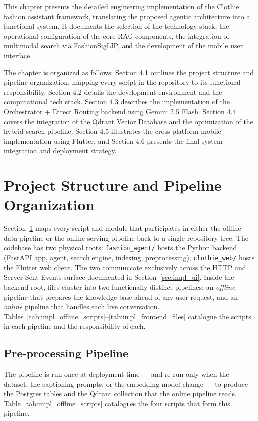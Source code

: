 This chapter presents the detailed engineering implementation of the Clothie fashion assistant framework, translating the proposed agentic architecture into a functional system. It documents the selection of the technology stack, the operational configuration of the core RAG components, the integration of multimodal search via FashionSigLIP, and the development of the mobile user interface.

The chapter is organized as follows: Section 4.1 outlines the project structure and pipeline organization, mapping every script in the repository to its functional responsibility. Section 4.2 details the development environment and the computational tech stack. Section 4.3 describes the implementation of the Orchestrator + Direct Routing backend using Gemini 2.5 Flash. Section 4.4 covers the integration of the Qdrant Vector Database and the optimization of the hybrid search pipeline. Section 4.5 illustrates the cross-platform mobile implementation using Flutter, and Section 4.6 presents the final system integration and deployment strategy.

\section{Project Structure and Pipeline Organization}
\label{sec:impl_structure}

Section~\ref{sec:impl_structure} maps every script and module that participates in either the offline data pipeline or the online serving pipeline back to a single repository tree. The codebase has two physical roots: \texttt{fashion\_agent/} hosts the Python backend (FastAPI app, agent, search engine, indexing, preprocessing); \texttt{clothie\_web/} hosts the Flutter web client. The two communicate exclusively across the HTTP and Server-Sent-Events surface documented in Section~\ref{sec:impl_ui}. Inside the backend root, files cluster into two functionally distinct pipelines: an \emph{offline} pipeline that prepares the knowledge base ahead of any user request, and an \emph{online} pipeline that handles each live conversation. Tables~\ref{tab:impl_offline_scripts}--\ref{tab:impl_frontend_files} catalogue the scripts in each pipeline and the responsibility of each.


\subsection{Pre-processing Pipeline}

The  pipeline is run once at deployment time --- and re-run only when the dataset, the captioning prompts, or the embedding model change --- to produce the Postgres tables and the Qdrant collection that the online pipeline reads. Table~\ref{tab:impl_offline_scripts} catalogues the four scripts that form this pipeline.

